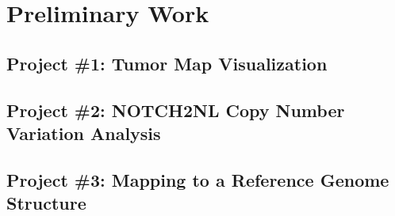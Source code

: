 \documentclass[11pt,proposal]{ucthesis}
\begin{document}
\chapter{Preliminary Work}


\section{Project \#1: Tumor Map Visualization}

    
    
    

    

\section{Project \#2: NOTCH2NL Copy Number Variation Analysis}

    
    
        
    


\section{Project \#3: Mapping to a Reference Genome Structure}
\end{document}
